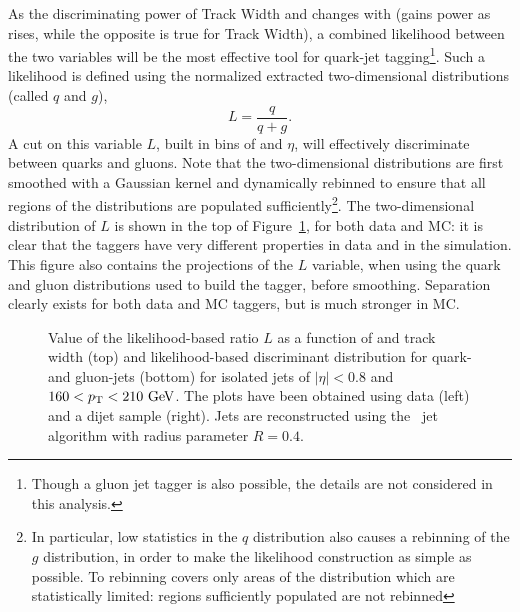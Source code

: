 As the discriminating power of Track Width and \ntrk changes with \pt (\ntrk gains power as \pt rises, while the opposite is true for Track Width), a combined likelihood between the two variables will be the most effective tool for quark-jet tagging\footnote{Though a gluon jet tagger is also possible, the details are not considered in this analysis.}. Such a likelihood is defined using the normalized extracted two-dimensional distributions (called $q$ and $g$),
%
\begin{equation}
L=\frac{q}{q+g}.
\end{equation}
%
A cut on this variable $L$, built in bins of \pt and $\eta$, will effectively discriminate between quarks and gluons. Note that the two-dimensional distributions are first smoothed with a Gaussian kernel and dynamically rebinned to ensure that all regions of the distributions are populated sufficiently\footnote{In particular, low statistics in the $q$ distribution also causes a rebinning of the $g$ distribution, in order to make the likelihood construction as simple as possible. To rebinning covers only areas of the distribution which are statistically limited: regions sufficiently populated are not rebinned}. The two-dimensional distribution of $L$ is shown in the top of Figure~\ref{fig:jet-reconstruction:qg:likelihoodSample}, for both data and MC: it is clear that the taggers have very different properties in data and in the simulation. This figure also contains the projections of the $L$ variable, when using the quark and gluon distributions used to build the tagger, before smoothing. Separation clearly exists for both data and MC taggers, but is much stronger in MC.



\begin{figure}[tbp]
\begin{center}
\caption{ Value of the likelihood-based ratio $L$ as a function of \ntrk and track width (top) and 
likelihood-based discriminant distribution for quark- and gluon-jets (bottom) for isolated jets 
of $|\eta|<0.8$ and $160<\pt<210\GeV$. The plots have been obtained using data (left) and
a  dijet sample (right). Jets are reconstructed using the \akt\ jet algorithm
with radius parameter $R=0.4$. }
\label{fig:jet-reconstruction:qg:likelihoodSample}
\end{center}
\end{figure}

